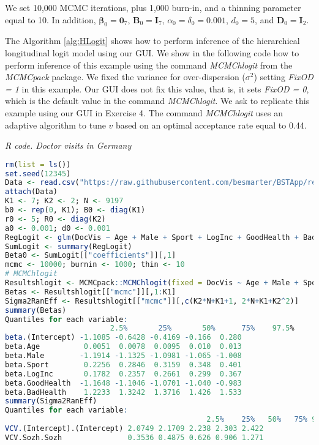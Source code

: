 We set 10,000 MCMC iterations, plus 1,000 burn-in, and a thinning parameter equal to 10. In addition, $\bm{\beta}_0 = \bm{0}_7$, $\bm{B}_0 = \bm{I}_7$, $\alpha_0 = \delta_0 = 0.001$, $d_0 = 5$, and $\bm{D}_0 = \bm{I}_2$.

The Algorithm \ref{alg:HLogit} shows how to perform inference of the hierarchical longitudinal logit model using our GUI. We show in the following code how to perform inference of this example using the command \textit{MCMChlogit} from the \textit{MCMCpack} package. We fixed the variance for over-dispersion ($\sigma^2$) setting \textit{FixOD = 1} in this example. Our GUI does not fix this value, that is, it sets \textit{FixOD = 0}, which is the default value in the command \textit{MCMChlogit}. We ask to replicate this example using our GUI in Exercise 4. The command \textit{MCMChlogit} uses an adaptive algorithm to tune $v$ based on an optimal acceptance rate equal to 0.44. 

\begin{tcolorbox}[enhanced,width=4.67in,center upper,
	fontupper=\large\bfseries,drop shadow southwest,sharp corners]
	\textit{R code. Doctor visits in Germany}
	\begin{VF}
		\begin{lstlisting}[language=R]
rm(list = ls())
set.seed(12345)
Data <- read.csv("https://raw.githubusercontent.com/besmarter/BSTApp/refs/heads/master/DataApp/9VisitDoc.csv", sep = ",", header = TRUE, quote = "")
attach(Data)
K1 <- 7; K2 <- 2; N <- 9197
b0 <- rep(0, K1); B0 <- diag(K1)
r0 <- 5; R0 <- diag(K2)
a0 <- 0.001; d0 <- 0.001
RegLogit <- glm(DocVis ~ Age + Male + Sport + LogInc + GoodHealth + BadHealth, family = binomial(link = "logit"))
SumLogit <- summary(RegLogit)
Beta0 <- SumLogit[["coefficients"]][,1]
mcmc <- 10000; burnin <- 1000; thin <- 10
# MCMChlogit
Resultshlogit <- MCMCpack::MCMChlogit(fixed = DocVis ~ Age + Male + Sport + LogInc + GoodHealth + BadHealth, random = ~Sozh, group="id", data = Data, burnin = burnin, mcmc = mcmc, thin = thin, mubeta = b0, Vbeta = B0, r = r0, R = R0, nu = a0, delta = d0, beta.start = Beta0, FixOD = 1)
Betas <- Resultshlogit[["mcmc"]][,1:K1]
Sigma2RanEff <- Resultshlogit[["mcmc"]][,c(K2*N+K1+1, 2*N+K1+K2^2)]
summary(Betas)
Quantiles for each variable:
						2.5%       25%       50%      75%    97.5%
beta.(Intercept) -1.1085 -0.6428 -0.4169 -0.166  0.280
beta.Age          0.0051  0.0078  0.0095  0.010  0.013
beta.Male        -1.1914 -1.1325 -1.0981 -1.065 -1.008
beta.Sport        0.2256  0.2846  0.3159  0.348  0.401
beta.LogInc       0.1782  0.2357  0.2661  0.299  0.367
beta.GoodHealth  -1.1648 -1.1046 -1.0701 -1.040 -0.983
beta.BadHealth    1.2233  1.3242  1.3716  1.426  1.533
summary(Sigma2RanEff)
Quantiles for each variable:
								              2.5%    25%   50%   75% 97.5%
VCV.(Intercept).(Intercept) 2.0749 2.1709 2.238 2.303 2.422
VCV.Sozh.Sozh               0.3536 0.4875 0.626 0.906 1.271
\end{lstlisting}
	\end{VF}
\end{tcolorbox}

